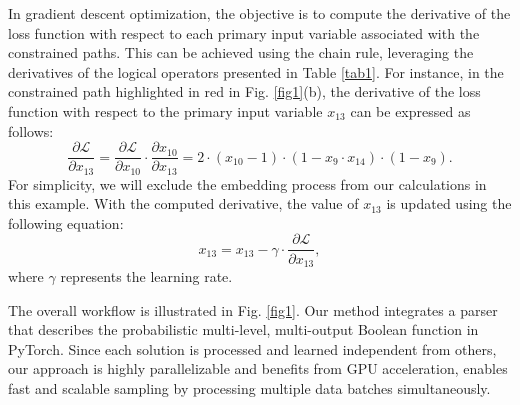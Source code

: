 In gradient descent optimization, the objective is to compute the derivative of the loss function with respect to each primary input variable associated with the constrained paths. This can be achieved using the chain rule, leveraging the derivatives of the logical operators presented in Table \ref{tab1}. For instance, in the constrained path highlighted in red in Fig. \ref{fig1}(b), the derivative of the loss function with respect to the primary input variable $x_{13}$ can be expressed as follows:
\begin{equation}
    \dfrac{\partial \mathcal{L}}{\partial x_{13}} = \dfrac{\partial \mathcal{L}}{\partial x_{10}} \cdot \dfrac{\partial x_{10}}{\partial x_{13}} = 2\cdot (x_{10} - 1) \cdot (1 - x_9 \cdot x_{14})\cdot (1 - x_9).
\end{equation}
For simplicity, we will exclude the embedding process from our calculations in this example. With the computed derivative, the value of $x_{13}$ is updated using the following equation:
\begin{equation}
    x_{13} = x_{13} - \gamma \cdot \dfrac{\partial \mathcal{L}}{\partial x_{13}},
\end{equation}
where $\gamma$ represents the learning rate.

The overall workflow is illustrated in Fig. \ref{fig1}. Our method integrates a parser that describes the probabilistic multi-level, multi-output Boolean function  in PyTorch. Since each solution is processed and learned independent from others, our approach is highly parallelizable and benefits from GPU acceleration, enables fast and scalable sampling by processing multiple data batches simultaneously.



